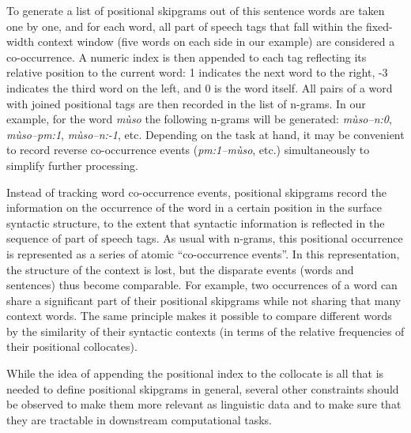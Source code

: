 \documentclass[12pt]{article}
\begin{document}
To generate a list of positional skipgrams out of this sentence words
are taken one by one, and for each word, all part of speech tags that
fall within the fixed-width context window (five words on each side in
our example) are considered a co-occurrence. A numeric index is then
appended to each tag reflecting its relative position to the current
word: 1 indicates the next word to the right, -3 indicates the third
word on the left, and 0 is the word itself. All pairs of a word
with joined positional tags are then recorded in the list of
n-grams. In our example, for the word \textit{mùso} the following
n-grams will be generated: \textit{mùso--n:0}, \textit{mùso--pm:1},
\textit{mùso--n:-1}, etc.  Depending on the task at hand, it may be
convenient to record reverse co-occurrence events (\textit{pm:1--mùso},
etc.) simultaneously to simplify further processing.

Instead of tracking word co-occurrence events, positional skipgrams
record the information on the occurrence of the word in a certain
position in the surface syntactic structure, to the extent that
syntactic information is reflected in the sequence of part of speech
tags. As usual with n-grams, this positional occurrence is represented
as a series of atomic “co-occurrence events”. In this representation,
the structure of the context is lost, but the disparate events (words
and sentences) thus become comparable. For example, two occurrences of
a word can share a significant part of their positional skipgrams
while not sharing that many context words. The same principle makes it
possible to compare different words by the similarity of their
syntactic contexts (in terms of the relative frequencies of their
positional collocates).



While the idea of appending the positional index to the collocate is all that
is needed to define positional skipgrams in general, several other
constraints should be observed to make them more relevant as
linguistic data and to make sure that they are tractable in
downstream computational tasks.
\end{document}
